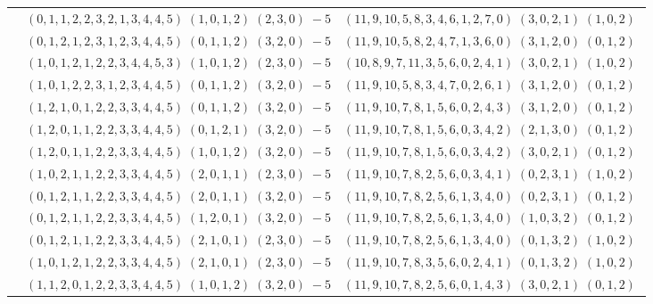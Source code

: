 \documentclass[11pt]{article}
\begin{document}
\begin{longtable}[l]{|c|c|c|}
 \cline{2-3} 
 & $(0 ,1 ,1 ,2 ,2 ,3 ,2 ,1 ,3 ,4 ,4 ,5) \;(1 ,0 ,1 ,2) \;(2 ,3 ,0) \;-5$ & $(11 ,9 ,10 ,5 ,8 ,3 ,4 ,6 ,1 ,2 ,7 ,0) \;(3 ,0 ,2 ,1) \;(1 ,0 ,2) \;$\\ 
 \cline{2-3} 
 & $(0 ,1 ,2 ,1 ,2 ,3 ,1 ,2 ,3 ,4 ,4 ,5) \;(0 ,1 ,1 ,2) \;(3 ,2 ,0) \;-5$ & $(11 ,9 ,10 ,5 ,8 ,2 ,4 ,7 ,1 ,3 ,6 ,0) \;(3 ,1 ,2 ,0) \;(0 ,1 ,2) \;$\\ 
 \cline{2-3} 
 & $(1 ,0 ,1 ,2 ,1 ,2 ,2 ,3 ,4 ,4 ,5 ,3) \;(1 ,0 ,1 ,2) \;(2 ,3 ,0) \;-5$ & $(10 ,8 ,9 ,7 ,11 ,3 ,5 ,6 ,0 ,2 ,4 ,1) \;(3 ,0 ,2 ,1) \;(1 ,0 ,2) \;$\\ 
 \cline{2-3} 
 & $(1 ,0 ,1 ,2 ,2 ,3 ,1 ,2 ,3 ,4 ,4 ,5) \;(0 ,1 ,1 ,2) \;(3 ,2 ,0) \;-5$ & $(11 ,9 ,10 ,5 ,8 ,3 ,4 ,7 ,0 ,2 ,6 ,1) \;(3 ,1 ,2 ,0) \;(0 ,1 ,2) \;$\\ 
 \cline{2-3} 
 & $(1 ,2 ,1 ,0 ,1 ,2 ,2 ,3 ,3 ,4 ,4 ,5) \;(0 ,1 ,1 ,2) \;(3 ,2 ,0) \;-5$ & $(11 ,9 ,10 ,7 ,8 ,1 ,5 ,6 ,0 ,2 ,4 ,3) \;(3 ,1 ,2 ,0) \;(0 ,1 ,2) \;$\\ 
 \cline{2-3} 
 & $(1 ,2 ,0 ,1 ,1 ,2 ,2 ,3 ,3 ,4 ,4 ,5) \;(0 ,1 ,2 ,1) \;(3 ,2 ,0) \;-5$ & $(11 ,9 ,10 ,7 ,8 ,1 ,5 ,6 ,0 ,3 ,4 ,2) \;(2 ,1 ,3 ,0) \;(0 ,1 ,2) \;$\\ 
 \cline{2-3} 
 & $(1 ,2 ,0 ,1 ,1 ,2 ,2 ,3 ,3 ,4 ,4 ,5) \;(1 ,0 ,1 ,2) \;(3 ,2 ,0) \;-5$ & $(11 ,9 ,10 ,7 ,8 ,1 ,5 ,6 ,0 ,3 ,4 ,2) \;(3 ,0 ,2 ,1) \;(0 ,1 ,2) \;$\\ 
 \cline{2-3} 
 & $(1 ,0 ,2 ,1 ,1 ,2 ,2 ,3 ,3 ,4 ,4 ,5) \;(2 ,0 ,1 ,1) \;(2 ,3 ,0) \;-5$ & $(11 ,9 ,10 ,7 ,8 ,2 ,5 ,6 ,0 ,3 ,4 ,1) \;(0 ,2 ,3 ,1) \;(1 ,0 ,2) \;$\\ 
 \cline{2-3} 
 & $(0 ,1 ,2 ,1 ,1 ,2 ,2 ,3 ,3 ,4 ,4 ,5) \;(2 ,0 ,1 ,1) \;(3 ,2 ,0) \;-5$ & $(11 ,9 ,10 ,7 ,8 ,2 ,5 ,6 ,1 ,3 ,4 ,0) \;(0 ,2 ,3 ,1) \;(0 ,1 ,2) \;$\\ 
 \cline{2-3} 
 & $(0 ,1 ,2 ,1 ,1 ,2 ,2 ,3 ,3 ,4 ,4 ,5) \;(1 ,2 ,0 ,1) \;(3 ,2 ,0) \;-5$ & $(11 ,9 ,10 ,7 ,8 ,2 ,5 ,6 ,1 ,3 ,4 ,0) \;(1 ,0 ,3 ,2) \;(0 ,1 ,2) \;$\\ 
 \cline{2-3} 
 & $(0 ,1 ,2 ,1 ,1 ,2 ,2 ,3 ,3 ,4 ,4 ,5) \;(2 ,1 ,0 ,1) \;(2 ,3 ,0) \;-5$ & $(11 ,9 ,10 ,7 ,8 ,2 ,5 ,6 ,1 ,3 ,4 ,0) \;(0 ,1 ,3 ,2) \;(1 ,0 ,2) \;$\\ 
 \cline{2-3} 
 & $(1 ,0 ,1 ,2 ,1 ,2 ,2 ,3 ,3 ,4 ,4 ,5) \;(2 ,1 ,0 ,1) \;(2 ,3 ,0) \;-5$ & $(11 ,9 ,10 ,7 ,8 ,3 ,5 ,6 ,0 ,2 ,4 ,1) \;(0 ,1 ,3 ,2) \;(1 ,0 ,2) \;$\\ 
 \cline{2-3} 
 & $(1 ,1 ,2 ,0 ,1 ,2 ,2 ,3 ,3 ,4 ,4 ,5) \;(1 ,0 ,1 ,2) \;(3 ,2 ,0) \;-5$ & $(11 ,9 ,10 ,7 ,8 ,2 ,5 ,6 ,0 ,1 ,4 ,3) \;(3 ,0 ,2 ,1) \;(0 ,1 ,2) \;$\\ 

\end{longtable}
\end{document}
